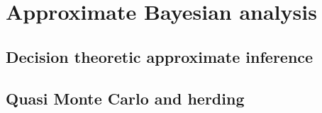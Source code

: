 \part{Approximate Bayesian analysis}

\chapter{Decision theoretic approximate inference}


\chapter{Quasi Monte Carlo and herding}


